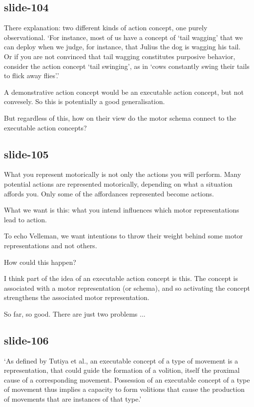\documentclass[12pt,\papersize]{extarticle}
\begin{document}
\subsection{slide-104}
There explanation: two different kinds of action concept, one purely
observational.
‘For instance, most of us have a concept of ‘tail wagging’ that we can deploy when we
judge, for instance, that Julius the dog is wagging his tail. Or if you are not
convinced that tail wagging constitutes purposive behavior, consider the action concept
‘tail swinging’, as in ‘cows constantly swing their tails to flick away flies’.’

A demonstrative action concept would be an executable action concept,
but not convesely.
So this is potentially a good generalisation.

But regardless of this, how on their view do the motor schema connect to the
executable action concepts?

\subsection{slide-105}
What you represent motorically is not only the actions you will perform.
Many potential actions are represented motorically, depending on what a situation
affords you.
Only some of the affordances represented become actions.

What we want is this: what you intend influences
which motor representations lead to action.

To echo Velleman, we want intentions to throw their weight behind some
motor representations and not others.

How could this happen?

I think part of the idea of an executable action concept is this.
The concept is associated with a motor representation (or schema),
and so activating the concept strengthens the associated motor
representation.

So far, so good.  There are just two problems ...

\subsection{slide-106}
‘As defined by Tutiya et al., an executable concept of a type of movement is a
representation, that could guide the formation of a volition, itself the proximal cause of
a corresponding movement. Possession of an executable concept of a type of movement thus
implies a capacity to form volitions that cause the production of movements that are
instances of that type.’
\citep[p.~7]{pacherie:2011_nonconceptual}
\end{document}
